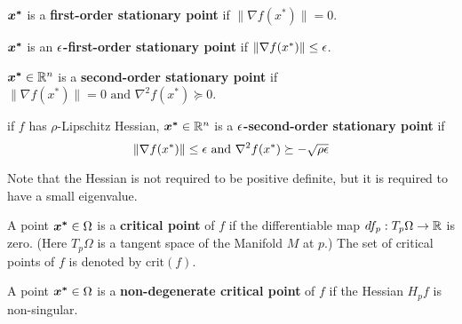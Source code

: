 \documentclass[10pt]{article}
\begin{document}
        \begin{definition}
            $\bm{x^*}$ is a \textbf{first-order stationary point}
            if $\| \nabla f(x^*) \| = 0$.
        \end{definition}

        \begin{definition}
            $\bm{x^*}$ is an \textbf{$\epsilon$-first-order stationary point} 
            if $\|\nabla f(x^*)\| \leq \epsilon$. 
        \end{definition}

        \begin{definition}
            $\bm{x^*} \in \mathbb{R}^n$ is a \textbf{second-order stationary point} if 
            $\| \nabla f(x^*) \| = 0\text{ and } \nabla^2 f(x^*) \succeq 0$.
        \end{definition}

        \begin{definition}
            if $f$ has $\rho$-Lipschitz Hessian, $\bm{x^*} \in \mathbb{R}^n$ is a
            \textbf{$\epsilon$-second-order stationary point} if 
            $$
                \| \nabla f(x^*) \| \leq \epsilon \text{ and }\nabla^2 f(x^*) \succeq -\sqrt{\rho \epsilon}
            $$
            \begin{remark}
                Note that the Hessian is not required to be positive definite, 
                but it is required to have a small eigenvalue. 
            \end{remark}
        \end{definition}

        \begin{definition}
            A point $\bm{x^*} \in \Omega$ is a \textbf{critical point} of $f$ if the
            differentiable map $df_p: T_p \Omega \rightarrow \mathbb{R}$ is zero. (Here
            $T_p \Omega$ is a tangent space of the Manifold $M$ at $p$.) 
            The set of critical points of $f$ is denoted by $\text{crit}(f)$.
        \end{definition}

        \begin{definition}
            A point $\bm{x^*} \in \Omega$ is a \textbf{non-degenerate critical point} of $f$ if
            the Hessian $H_p f$ is non-singular.
        \end{definition}
\end{document}
